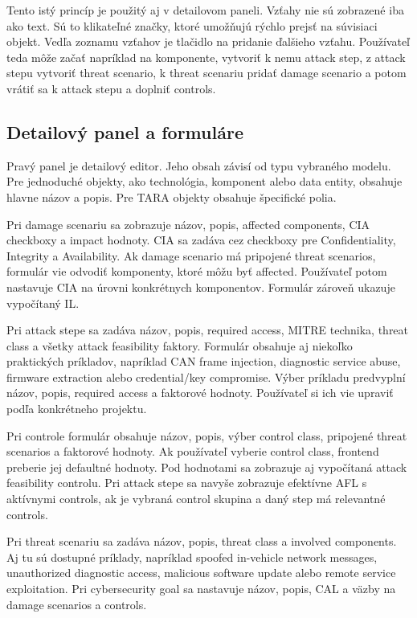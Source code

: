 \documentclass[11pt]{article}
\begin{document}
Tento istý princíp je použitý aj v detailovom paneli. Vzťahy nie sú zobrazené iba ako text. Sú to klikateľné značky, ktoré umožňujú rýchlo prejsť na súvisiaci objekt. Vedľa zoznamu vzťahov je tlačidlo na pridanie ďalšieho vzťahu. Používateľ teda môže začať napríklad na komponente, vytvoriť k nemu attack step, z attack stepu vytvoriť threat scenario, k threat scenariu pridať damage scenario a potom vrátiť sa k attack stepu a doplniť controls.

\subsection{Detailový panel a formuláre}

Pravý panel je detailový editor. Jeho obsah závisí od typu vybraného modelu. Pre jednoduché objekty, ako technológia, komponent alebo data entity, obsahuje hlavne názov a popis. Pre TARA objekty obsahuje špecifické polia.

Pri damage scenariu sa zobrazuje názov, popis, affected components, CIA checkboxy a impact hodnoty. CIA sa zadáva cez checkboxy pre Confidentiality, Integrity a Availability. Ak damage scenario má pripojené threat scenarios, formulár vie odvodiť komponenty, ktoré môžu byť affected. Používateľ potom nastavuje CIA na úrovni konkrétnych komponentov. Formulár zároveň ukazuje vypočítaný IL.

Pri attack stepe sa zadáva názov, popis, required access, MITRE technika, threat class a všetky attack feasibility faktory. Formulár obsahuje aj niekoľko praktických príkladov, napríklad CAN frame injection, diagnostic service abuse, firmware extraction alebo credential/key compromise. Výber príkladu predvyplní názov, popis, required access a faktorové hodnoty. Používateľ si ich vie upraviť podľa konkrétneho projektu.

Pri controle formulár obsahuje názov, popis, výber control class, pripojené threat scenarios a faktorové hodnoty. Ak používateľ vyberie control class, frontend preberie jej defaultné hodnoty. Pod hodnotami sa zobrazuje aj vypočítaná attack feasibility controlu. Pri attack stepe sa navyše zobrazuje efektívne AFL s aktívnymi controls, ak je vybraná control skupina a daný step má relevantné controls.

Pri threat scenariu sa zadáva názov, popis, threat class a involved components. Aj tu sú dostupné príklady, napríklad spoofed in-vehicle network messages, unauthorized diagnostic access, malicious software update alebo remote service exploitation. Pri cybersecurity goal sa nastavuje názov, popis, CAL a väzby na damage scenarios a controls.
\end{document}
